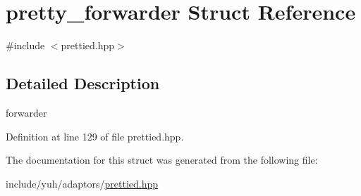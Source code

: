\hypertarget{structyuh_1_1range__detail_1_1pretty__forwarder}{\section{pretty\-\_\-forwarder \-Struct \-Reference}
\label{db/d79/structyuh_1_1range__detail_1_1pretty__forwarder}
}


{\ttfamily \#include $<$prettied.\-hpp$>$}



\subsection{\-Detailed \-Description}
forwarder 

\-Definition at line 129 of file prettied.\-hpp.



\-The documentation for this struct was generated from the following file\-:\begin{DoxyCompactItemize}
\item 
include/yuh/adaptors/\hyperlink{prettied_8hpp}{prettied.\-hpp}\end{DoxyCompactItemize}
